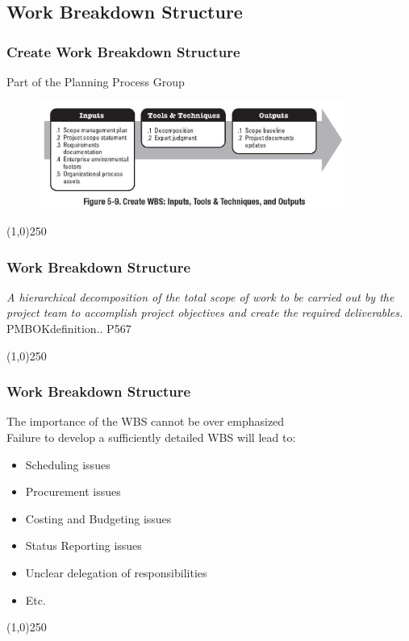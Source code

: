 \subsection{Work Breakdown Structure}


\begin{frame}
\frametitle{Create Work Breakdown Structure}{Part of the Planning Process Group}
\begin{figure}
	\centering
		\includegraphics[width = 10cm]{images/Fig5-9.jpg}
	\label{fig:5-9}
\end{figure}
\end{frame}\begin{center}\line(1,0){250}\end{center}



\begin{frame}
\frametitle{Work Breakdown Structure}
\emph{A hierarchical decomposition of the total scope of work to be carried out by the project team to accomplish project objectives and create the required deliverables.}\\
\hspace{2cm} PMBOK\textregistered definition.. P567
\end{frame}\begin{center}\line(1,0){250}\end{center}



\begin{frame}
\frametitle{Work Breakdown Structure}
The importance of the WBS cannot be over emphasized\\
Failure to develop a sufficiently detailed WBS will lead to:\\
\begin{itemize}
	\item Scheduling issues
	\item Procurement issues
	\item Costing and Budgeting issues
	\item Status Reporting issues
	\item Unclear delegation of responsibilities
	\item Etc.
\end{itemize}
\end{frame}\begin{center}\line(1,0){250}\end{center}



